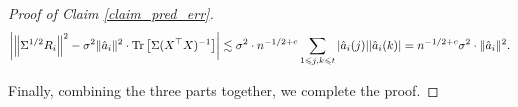 \begin{proof}[Proof of Claim \ref{claim_pred_err}]
\begin{align*}
		{\left| {\left\| \Sigma^{1/2} R_i \right\|^2 -  \sigma^2 \|\hat a_i\|^2 \cdot\operatorname{Tr}\left[\Sigma(X^\top X)^{-1}\right]} \right|} \lesssim  \sigma^2 \cdot n^{-1/2+c}  \sum_{1\leqslant j,k\leqslant t}|\hat a_i(j)||\hat a_i(k)| =  n^{-1/2+c} \sigma^2 \cdot  \|\hat a_i\|^2.
	\end{align*}

	Finally, combining the three parts together, we complete the proof.
\end{proof}
